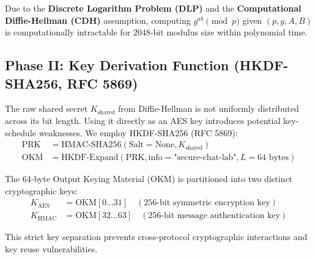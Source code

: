 \documentclass[11pt,a4paper]{article}
\begin{document}
Due to the \textbf{Discrete Logarithm Problem (DLP)} and the \textbf{Computational Diffie-Hellman (CDH)} assumption, computing $g^{ab} \pmod{p}$ given $(p, g, A, B)$ is computationally intractable for 2048-bit modulus size within polynomial time.

\subsection{Phase II: Key Derivation Function (HKDF-SHA256, RFC 5869)}
The raw shared secret $K_{\text{shared}}$ from Diffie-Hellman is not uniformly distributed across its bit length. Using it directly as an AES key introduces potential key-schedule weaknesses. We employ HKDF-SHA256 (RFC 5869):
\begin{align}
    \text{PRK} &= \text{HMAC-SHA256}(\text{Salt}=\text{None}, K_{\text{shared}}) \\
    \text{OKM} &= \text{HKDF-Expand}(\text{PRK}, \text{info}=\text{"secure-chat-lab"}, L=64 \text{ bytes})
\end{align}

The 64-byte Output Keying Material (OKM) is partitioned into two distinct cryptographic keys:
\begin{align}
    K_{\text{AES}} &= \text{OKM}[0 \dots 31] \quad (\text{256-bit symmetric encryption key}) \\
    K_{\text{HMAC}} &= \text{OKM}[32 \dots 63] \quad (\text{256-bit message authentication key})
\end{align}

This strict key separation prevents cross-protocol cryptographic interactions and key reuse vulnerabilities.
\end{document}
